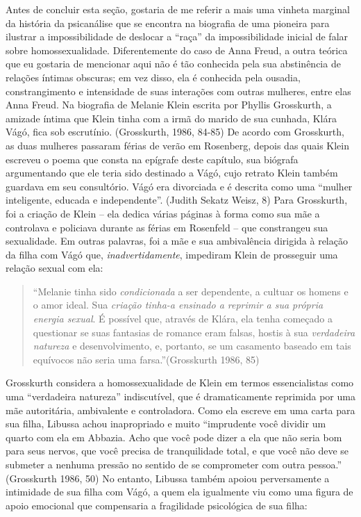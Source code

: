 Antes de concluir esta seção, gostaria de me referir a mais uma vinheta
marginal da história da psicanálise que se encontra na biografia de uma
pioneira para ilustrar a impossibilidade de deslocar a ``raça'' da
impossibilidade inicial de falar sobre homossexualidade. Diferentemente
do caso de Anna Freud, a outra teórica que eu gostaria de mencionar aqui
não é tão conhecida pela sua abstinência de relações íntimas obscuras;
em vez disso, ela é conhecida pela ousadia, constrangimento e
intensidade de suas interações com outras mulheres, entre elas Anna
Freud. Na biografia de Melanie Klein escrita por Phyllis Grosskurth, a
amizade íntima que Klein tinha com a irmã do marido de sua cunhada,
Klára Vágó, fica sob escrutínio. (Grosskurth, 1986, 84-85) De acordo com
Grosskurth, as duas mulheres passaram férias de verão em Rosenberg,
depois das quais Klein escreveu o poema que consta na epígrafe deste
capítulo, sua biógrafa argumentando que ele teria sido destinado a Vágó,
cujo retrato Klein também guardava em seu consultório. Vágó era
divorciada e é descrita como uma ``mulher inteligente, educada e
independente''. (Judith Sekatz Weisz, 8) Para Grosskurth, foi a criação
de Klein -- ela dedica várias páginas à forma como sua mãe a controlava
e policiava durante as férias em Rosenfeld -- que constrangeu sua
sexualidade. Em outras palavras, foi a mãe e sua ambivalência dirigida à
relação da filha com Vágó que, \emph{inadvertidamente}, impediram Klein
de prosseguir uma relação sexual com ela:

\begin{quote}
``Melanie tinha sido \emph{condicionada} a ser dependente, a cultuar os
homens e o amor ideal. Sua \emph{criação tinha-a ensinado a reprimir a
sua própria energia sexual}. É possível que, através de Klára, ela tenha
começado a questionar se suas fantasias de romance eram falsas, hostis à
sua \emph{verdadeira natureza} e desenvolvimento, e, portanto, se um
casamento baseado em tais equívocos não seria uma farsa.''(Grosskurth
1986, 85)
\end{quote}

Grosskurth considera a homossexualidade de Klein em termos
essencialistas como uma ``verdadeira natureza'' indiscutível, que é
dramaticamente reprimida por uma mãe autoritária, ambivalente e
controladora. Como ela escreve em uma carta para sua filha, Libussa
achou inapropriado e muito ``imprudente você dividir um quarto com ela
em Abbazia. Acho que você pode dizer a ela que não seria bom para seus
nervos, que você precisa de tranquilidade total, e que você não deve se
submeter a nenhuma pressão no sentido de se comprometer com outra
pessoa.'' (Grosskurth 1986, 50) No entanto, Libussa também apoiou
perversamente a intimidade de sua filha com Vágó, a quem ela igualmente
viu como uma figura de apoio emocional que compensaria a fragilidade
psicológica de sua filha:

